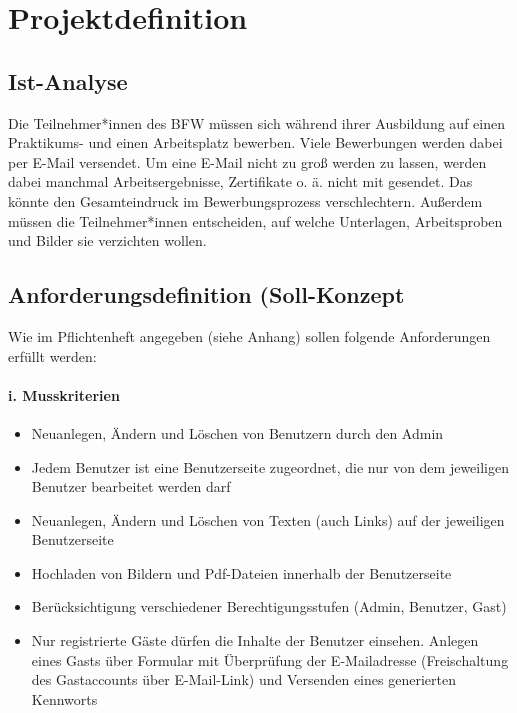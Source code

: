 \documentclass[10.5pt]{scrarticle}
\begin{document}
\section{Projektdefinition}
\subsection{Ist-Analyse}

Die Teilnehmer*innen des BFW müssen sich während ihrer Ausbildung auf einen Praktikums- und einen Arbeitsplatz bewerben. Viele Bewerbungen werden dabei per E-Mail versendet. Um eine E-Mail nicht zu gro{\ss} werden zu lassen, werden dabei manchmal Arbeitsergebnisse, Zertifikate o. ä. nicht mit gesendet. Das könnte den Gesamteindruck im Bewerbungsprozess verschlechtern.  
 Au{\ss}erdem müssen die Teilnehmer*innen entscheiden, auf welche Unterlagen, Arbeitsproben und Bilder sie verzichten wollen.
 
\subsection{Anforderungsdefinition (Soll-Konzept}

Wie im Pflichtenheft angegeben (siehe Anhang) sollen folgende Anforderungen erfüllt werden:

\paragraph{i. Musskriterien}

\begin{itemize}
\item Neuanlegen, Ändern und Löschen von Benutzern durch den Admin
\item Jedem Benutzer ist eine Benutzerseite zugeordnet, die nur von dem jeweiligen Benutzer bearbeitet werden darf
\item Neuanlegen, Ändern und Löschen von Texten (auch Links) auf der jeweiligen Benutzerseite
\item Hochladen von Bildern und Pdf-Dateien innerhalb der Benutzerseite
\item Berücksichtigung verschiedener Berechtigungsstufen (Admin, Benutzer, Gast)
\item  Nur registrierte Gäste dürfen die Inhalte der Benutzer einsehen. Anlegen eines Gasts über Formular mit Überprüfung der E-Mailadresse (Freischaltung des Gastaccounts über E-Mail-Link) und Versenden eines generierten Kennworts 
\end{itemize}
\end{document}
